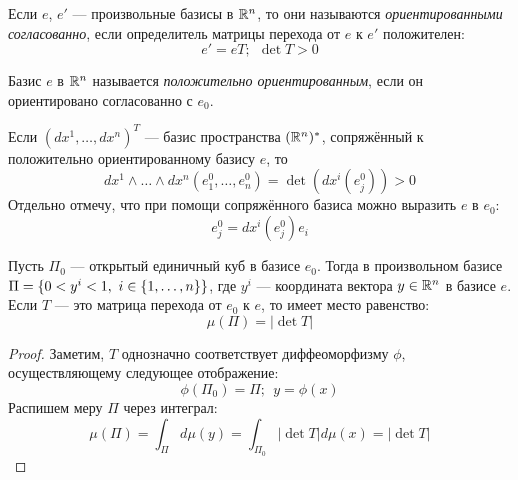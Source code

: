 \begin{definition}
	Если $e$, $e'$ --- произвольные базисы в $\mathbb{R}^n$, то они называются \textit{ориентированными согласованно}, если определитель матрицы перехода от $e$ к $e'$ положителен:
	\[
		e' = eT;\ \ \det T > 0
	\]
\end{definition}

\begin{definition}
	Базис $e$ в $\mathbb{R}^n$ называется \textit{положительно ориентированным}, если он ориентировано согласованно с $e_0$.
\end{definition}

\begin{note}
	Если $(dx^1, \ldots, dx^n)^T$ --- базис пространства $(\mathbb{R}^n)^*$, сопряжённый к положительно ориентированному базису $e$, то
	\[
		dx^1 \wedge \ldots \wedge dx^n(e_1^0, \ldots, e_n^0) = \det(dx^i(e_j^0)) > 0
	\]
	Отдельно отмечу, что при помощи сопряжённого базиса можно выразить $e$ в $e_0$:
	\[
		e_j^0 = dx^i(e_j^0) e_i
	\]
\end{note}

\begin{proposition}
	Пусть $\Pi_0$ --- открытый единичный куб в базисе $e_0$. Тогда в произвольном базисе $\Pi = \{0 < y^i < 1,\ i \in \{1, \ldots, n\}\}$, где $y^i$ --- координата вектора $y \in \mathbb{R}^n$ в базисе $e$. Если $T$ --- это матрица перехода от $e_0$ к $e$, то имеет место равенство:
	\[
		\mu(\Pi) = |\det T|
	\]
\end{proposition}

\begin{proof}
	Заметим, $T$ однозначно соответствует диффеоморфизму $\phi$, осуществляющему следующее отображение:
	\[
		\phi(\Pi_0) = \Pi;\ \ y = \phi(x)
	\]
	Распишем меру $\Pi$ через интеграл:
	\[
		\mu(\Pi) = \int_\Pi d\mu(y) = \int_{\Pi_0} |\det T| d\mu(x) = |\det T|
	\]
\end{proof}